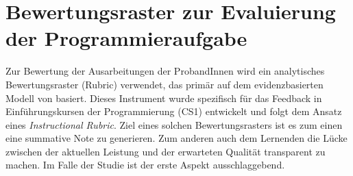 \section{Bewertungsraster zur Evaluierung der Programmieraufgabe}\label{cha:bewertungsraster}
Zur Bewertung der Ausarbeitungen der ProbandInnen wird ein analytisches Bewertungsraster (Rubric) verwendet, das primär auf dem evidenzbasierten Modell von \parencite{stegeman_designing_2016} basiert. Dieses Instrument wurde spezifisch für das Feedback in Einführungskursen der Programmierung (CS1) entwickelt und folgt dem Ansatz eines \textit{Instructional Rubric}. Ziel eines solchen Bewertungsrasters ist es zum einen eine summative Note zu generieren. Zum anderen auch dem Lernenden die Lücke zwischen der aktuellen Leistung und der erwarteten Qualität transparent zu machen. Im Falle der Studie ist der erste Aspekt ausschlaggebend.

